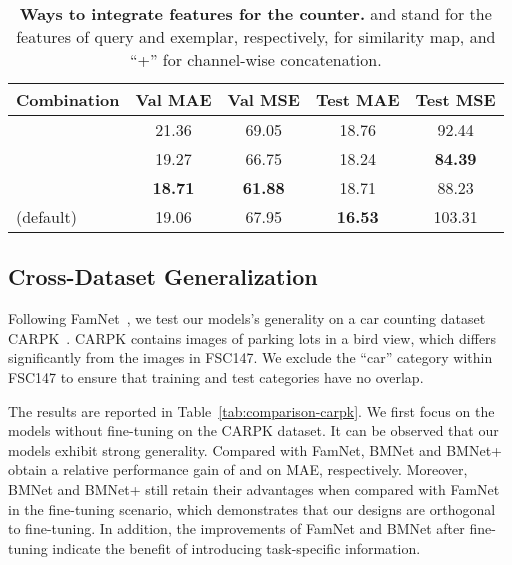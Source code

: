 \documentclass[10pt,twocolumn,letterpaper]{article}
\begin{document}
\begin{table}
  \centering
  \renewcommand{\arraystretch}{1.2}
  \addtolength{\tabcolsep}{0.25pt}
  \begin{tabular}{@{}lcccc@{}}
    \toprule
    \small{Combination}  & \small{Val MAE} & \small{Val MSE} & \small{Test MAE} & \small{Test MSE} \\ 
    \midrule
    \scriptsize{}                           & 21.36   & 69.05   & 18.76 & 92.44     \\
    \scriptsize{}        & 19.27   & 66.75   & 18.24 & \textbf{84.39}     \\
    \scriptsize{}  & \textbf{18.71}   & \textbf{61.88}   & 18.71    & 88.23  \\
    \scriptsize{} (default)          & 19.06   & 67.95   & \textbf{16.53} & 103.31  \\
    \bottomrule
    \end{tabular}
    \vspace{-10pt}
    \caption{\textbf{Ways to integrate features for the counter.}  and  stand for the features of query and exemplar, respectively,  for similarity map, and ``+'' for channel-wise concatenation.}
    \label{tab:comparison-feature-combination}
    \vspace{-5pt}
\end{table}

\subsection{Cross-Dataset Generalization}
Following FamNet~\cite{famnet}, we test our models's generality on a car counting dataset CARPK~\cite{carpk}. CARPK contains  images of parking lots in a bird view, which differs significantly from the images in FSC147. We exclude the ``car'' category within FSC147 to ensure that training and test categories have no overlap. 

The results are reported in Table~\ref{tab:comparison-carpk}. We first focus on the models without fine-tuning on the CARPK dataset. It can be observed that our models exhibit strong generality. Compared with FamNet, BMNet and BMNet+ obtain a relative performance gain of  and  on MAE, respectively. Moreover, BMNet and BMNet+ still retain their advantages when compared with FamNet in the fine-tuning scenario, which demonstrates that our designs are orthogonal to fine-tuning. In addition, the improvements of FamNet and BMNet after fine-tuning indicate the benefit of introducing task-specific information. 
\end{document}
